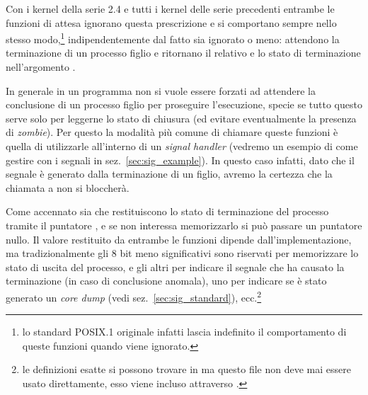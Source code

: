 Con i kernel della serie 2.4 e tutti i kernel delle serie precedenti entrambe
le funzioni di attesa ignorano questa prescrizione e si comportano sempre
nello stesso modo,\footnote{lo standard POSIX.1 originale infatti lascia
  indefinito il comportamento di queste funzioni quando  viene
  ignorato.} indipendentemente dal fatto  sia ignorato o meno:
attendono la terminazione di un processo figlio e ritornano il relativo
 e lo stato di terminazione nell'argomento .

In generale in un programma non si vuole essere forzati ad attendere la
conclusione di un processo figlio per proseguire l'esecuzione, specie se tutto
questo serve solo per leggerne lo stato di chiusura (ed evitare eventualmente
la presenza di \textit{zombie}).  Per questo la modalità più comune di
chiamare queste funzioni è quella di utilizzarle all'interno di un
\textit{signal handler} (vedremo un esempio di come gestire 
con i segnali in sez.~\ref{sec:sig_example}). In questo caso infatti, dato che
il segnale è generato dalla terminazione di un figlio, avremo la certezza che
la chiamata a  non si bloccherà.

Come accennato sia  che  restituiscono lo stato di
terminazione del processo tramite il puntatore , e se non
interessa memorizzarlo si può passare un puntatore nullo. Il valore restituito
da entrambe le funzioni dipende dall'implementazione, ma tradizionalmente gli
8 bit meno significativi sono riservati per memorizzare lo stato di uscita del
processo, e gli altri per indicare il segnale che ha causato la terminazione
(in caso di conclusione anomala), uno per indicare se è stato generato un
\textit{core dump} (vedi sez.~\ref{sec:sig_standard}), ecc.\footnote{le
  definizioni esatte si possono trovare in  ma
  questo file non deve mai essere usato direttamente, esso viene incluso
  attraverso .}


